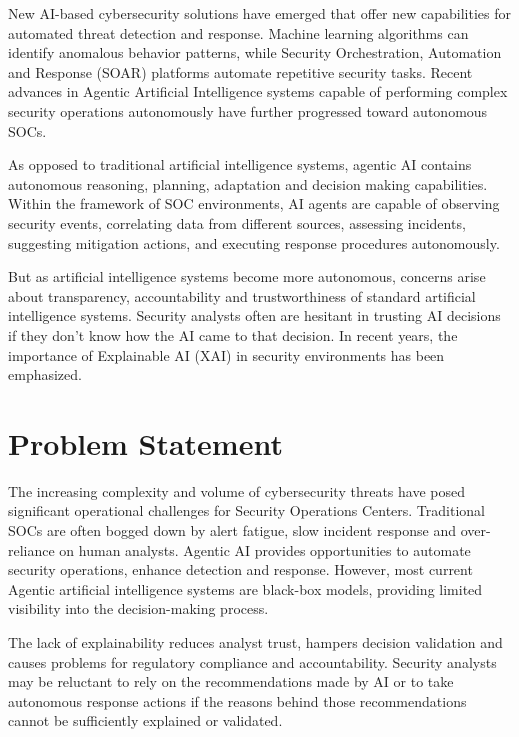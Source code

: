 \documentclass[12pt,a4paper]{report}
\begin{document}
New AI-based cybersecurity solutions have emerged that offer new capabilities for automated threat detection and response. Machine learning algorithms can identify anomalous behavior patterns, while Security Orchestration, Automation and Response (SOAR) platforms automate repetitive security tasks. Recent advances in Agentic Artificial Intelligence systems capable of performing complex security operations autonomously have further progressed toward autonomous SOCs.

As opposed to traditional artificial intelligence systems, agentic AI contains autonomous reasoning, planning, adaptation and decision making capabilities. Within the framework of SOC environments, AI agents are capable of observing security events, correlating data from different sources, assessing incidents, suggesting mitigation actions, and executing response procedures autonomously.

But as artificial intelligence systems become more autonomous, concerns arise about transparency, accountability and trustworthiness of standard artificial intelligence systems. Security analysts often are hesitant in trusting AI decisions if they don't know how the AI came to that decision. In recent years, the importance of Explainable AI (XAI) in security environments has been emphasized.

\section{Problem Statement}
\label{sec:problem}

The increasing complexity and volume of cybersecurity threats have posed significant operational challenges for Security Operations Centers. Traditional SOCs are often bogged down by alert fatigue, slow incident response and over-reliance on human analysts. Agentic AI provides opportunities to automate security operations, enhance detection and response. However, most current Agentic artificial intelligence systems are black-box models, providing limited visibility into the decision-making process.

The lack of explainability reduces analyst trust, hampers decision validation and causes problems for regulatory compliance and accountability. Security analysts may be reluctant to rely on the recommendations made by AI or to take autonomous response actions if the reasons behind those recommendations cannot be sufficiently explained or validated.
\end{document}
